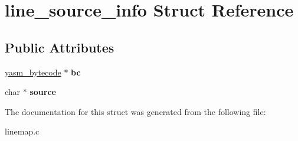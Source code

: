 \hypertarget{structline__source__info}{\section{line\-\_\-source\-\_\-info Struct Reference}
\label{structline__source__info}
}
\subsection*{Public Attributes}
\begin{DoxyCompactItemize}
\item 
\hypertarget{structline__source__info_a3b7bbfa21c4bfcb331a3e7abcb9f3a95}{\hyperlink{structyasm__bytecode}{yasm\-\_\-bytecode} $\ast$ {\bfseries bc}}\label{structline__source__info_a3b7bbfa21c4bfcb331a3e7abcb9f3a95}

\item 
\hypertarget{structline__source__info_a70c432b0f23bae5722b3fd7004dac1b0}{char $\ast$ {\bfseries source}}\label{structline__source__info_a70c432b0f23bae5722b3fd7004dac1b0}

\end{DoxyCompactItemize}


The documentation for this struct was generated from the following file\-:\begin{DoxyCompactItemize}
\item 
linemap.\-c\end{DoxyCompactItemize}
